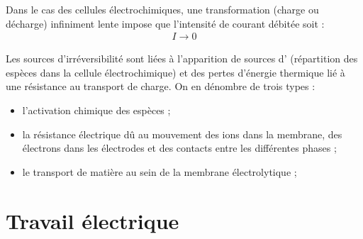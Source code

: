 
Dans le cas des cellules électrochimiques, une transformation (charge ou décharge) infiniment lente impose que l'intensité de courant débitée soit  :
\begin{align*}
I \to 0
\end{align*}

Les sources d'irréversibilité sont liées à l'apparition de sources d' (répartition des espèces dans la cellule électrochimique) et des pertes d'énergie thermique lié à une résistance au transport de charge. On en dénombre de trois types :
\begin{itemize}
\item l'activation chimique des espèces ;
\item la résistance électrique dû au mouvement des ions dans la membrane, des électrons dans les électrodes et des contacts entre les différentes phases ;
\item le transport de matière au sein de la membrane électrolytique ;
\end{itemize}





\section{Travail électrique}



